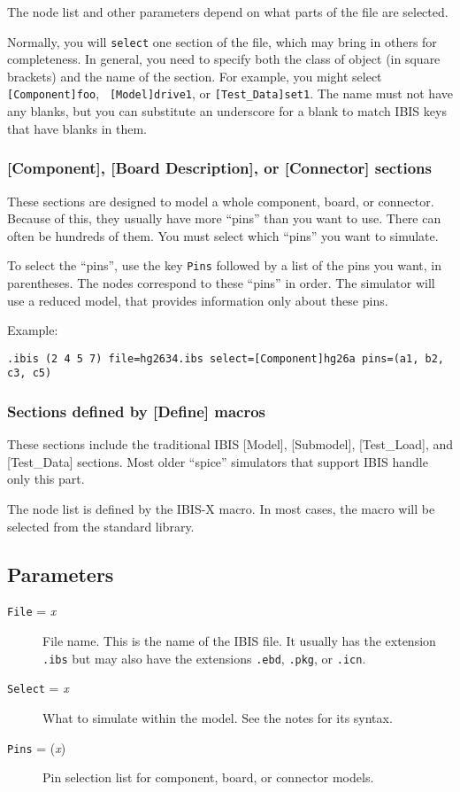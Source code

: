 The node list and other parameters depend on what parts of the file
are selected.

Normally, you will {\tt select} one section of the file, which may
bring in others for completeness.  In general, you need to specify
both the class of object (in square brackets) and the name of the
section.  For example, you might select {\tt [Component]foo}, {\tt
  [Model]drive1}, or {\tt [Test\_Data]set1}.  The name must not have
any blanks, but you can substitute an underscore for a blank to match
IBIS keys that have blanks in them.

\subsubsection{[Component], [Board Description], or [Connector] sections}

These sections are designed to model a whole component, board, or
connector.  Because of this, they usually have more ``pins'' than you
want to use.  There can often be hundreds of them.  You must select
which ``pins'' you want to simulate.

To select the ``pins'', use the key {\tt Pins} followed by a list of
the pins you want, in parentheses.  The nodes correspond to these
``pins'' in order.  The simulator will use a reduced model, that
provides information only about these pins.

Example:

{\tt .ibis (2 4 5 7) file=hg2634.ibs select=[Component]hg26a pins=(a1,
  b2, c3, c5)}

\subsubsection{Sections defined by [Define] macros}

These sections include the traditional IBIS [Model], [Submodel],
[Test\_Load], and [Test\_Data] sections.  Most older ``spice''
simulators that support IBIS handle only this part.

The node list is defined by the IBIS-X macro.  In most cases, the
macro will be selected from the standard library.
\subsection{Parameters}

\begin{description}
  
\item[{\tt File} = {\it x}] File name.  This is the name of the IBIS
  file.  It usually has the extension {\tt .ibs} but may also have the
  extensions {\tt .ebd}, {\tt .pkg}, or {\tt .icn}.
  
\item[{\tt Select} = {\it x}] What to simulate within the model.  See
  the notes for its syntax.
  
\item[{\tt Pins} = ({\it x})] Pin selection list for component, board,
  or connector models.

\end{description}
